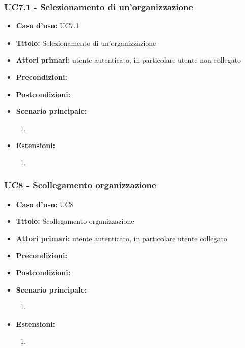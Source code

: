 \documentclass[casi-duso]{subfiles}
\begin{document}
\subsubsection{UC7.1 - Selezionamento di un'organizzazione}
\label{subsub:uc7utente}
\begin{itemize}
  \item \textbf{Caso d’uso:} UC7.1
  \item \textbf{Titolo:} Selezionamento di un'organizzazione
  \item \textbf{Attori primari:} utente autenticato, in particolare utente non collegato
  \item \textbf{Precondizioni:} 
  \item \textbf{Postcondizioni:}
  \item \textbf{Scenario principale:} 
  \begin{enumerate}
    \item 
  \end{enumerate}  
  \item \textbf{Estensioni:} 
  \begin{enumerate}
    \item 
  \end{enumerate}  
\end{itemize}

\subsubsection{UC8 - Scollegamento organizzazione}
\label{subsub:uc8utente}
\begin{itemize}
  \item \textbf{Caso d’uso:} UC8
  \item \textbf{Titolo:} Scollegamento organizzazione
  \item \textbf{Attori primari:} utente autenticato, in particolare utente collegato
  \item \textbf{Precondizioni:} 
  \item \textbf{Postcondizioni:}
  \item \textbf{Scenario principale:} 
  \begin{enumerate}
    \item 
  \end{enumerate}  
  \item \textbf{Estensioni:} 
  \begin{enumerate}
    \item 
  \end{enumerate}  
\end{itemize}
\end{document}
